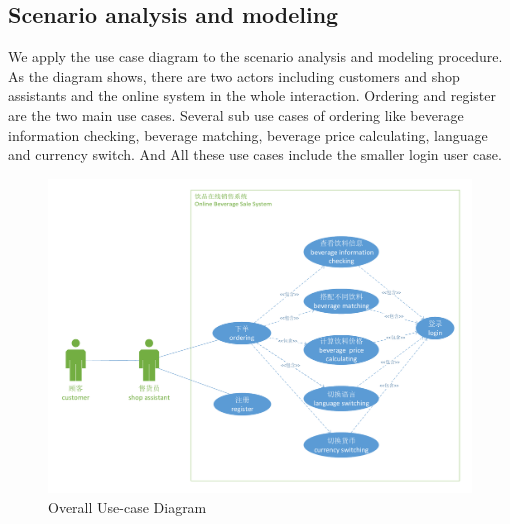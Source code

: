 \documentclass[a4paper]{report}
\begin{document}
\subsection{Scenario analysis and modeling}
We apply the use case diagram to the scenario analysis and modeling procedure. As the diagram shows, there are two actors including customers and shop assistants and the online  system in the whole interaction. Ordering and register are the  two main use cases. Several sub use cases of ordering like beverage information checking, beverage matching, beverage price calculating, language and currency switch. And All these use cases include the smaller login user case.
\begin{figure}[hbtp]
  \centering
  \includegraphics[scale=0.43]{useCase.pdf}
  \caption{Overall Use-case Diagram}\label{1}
\end{figure}
\end{document}
